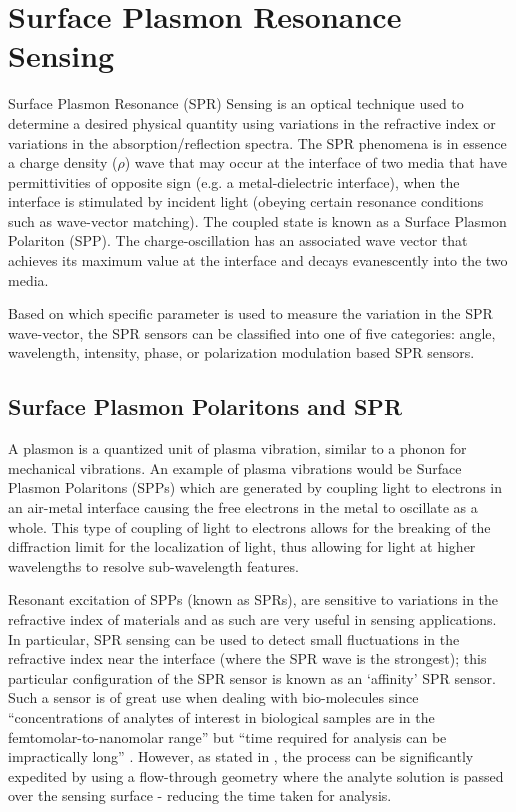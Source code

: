 \chapter{Surface Plasmon Resonance Sensing}

Surface Plasmon Resonance (SPR) Sensing is an optical technique used to determine a desired physical quantity using variations in the refractive index or variations in the absorption/reflection spectra. The SPR phenomena is in essence a charge density ($\rho$) wave that may occur at the interface of two media that have permittivities of opposite sign (e.g. a metal-dielectric interface), when the interface is stimulated by incident light (obeying certain resonance conditions such as wave-vector matching).  The coupled state is known as a Surface Plasmon Polariton (SPP). The charge-oscillation has an associated wave vector that achieves its maximum value at the interface and decays evanescently into the two media. 

Based on which specific parameter is used to measure the variation in the SPR wave-vector, the SPR sensors can be classified into one of five categories: angle, wavelength, intensity, phase, or polarization modulation based SPR sensors.  

\section{Surface Plasmon Polaritons and SPR}

A plasmon is a quantized unit of plasma vibration, similar to a phonon for mechanical vibrations. An example of plasma vibrations would be Surface Plasmon Polaritons (SPPs) which are generated by coupling light to electrons in an air-metal interface causing the free electrons in the metal to oscillate as a whole. This type of coupling of light to electrons allows for the breaking of the diffraction limit for the localization of light, thus allowing for light at higher wavelengths to resolve sub-wavelength features. 

Resonant excitation of SPPs (known as SPRs), are sensitive to variations in the refractive index of materials and as such are very useful in sensing applications. In particular, SPR sensing can be used to detect small fluctuations in the refractive index near the interface (where the SPR wave is the strongest); this particular configuration of the SPR sensor is known as an `affinity' SPR sensor. Such a sensor is of great use when dealing with bio-molecules since ``concentrations of analytes of interest in biological samples are in the femtomolar-to-nanomolar range'' but ``time required for analysis can be impractically long'' \cite{plasmon_future_bio}. However, as stated in \cite{plasmon_future_bio}, the process can be significantly expedited by using a flow-through geometry where the analyte solution is passed over the sensing surface - reducing the time taken for analysis.  

